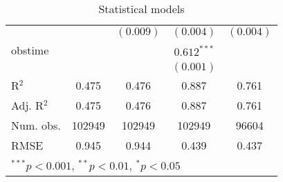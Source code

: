 \begin{table}
\begin{center}
\begin{tabular}{l c c c c }
                             &                & $(0.009)$      & $(0.004)$      & $(0.004)$      \\
obstime                      &                &                & $0.612^{***}$  &                \\
                             &                &                & $(0.001)$      &                \\
\hline
R$^2$                        & 0.475          & 0.476          & 0.887          & 0.761          \\
Adj. R$^2$                   & 0.475          & 0.476          & 0.887          & 0.761          \\
Num. obs.                    & 102949         & 102949         & 102949         & 96604          \\
RMSE                         & 0.945          & 0.944          & 0.439          & 0.437          \\
\hline
\multicolumn{5}{l}{\scriptsize{$^{***}p<0.001$, $^{**}p<0.01$, $^*p<0.05$}}
\end{tabular}
\caption{Statistical models}
\label{tab:fit_qaly}
\end{center}
\end{table}
